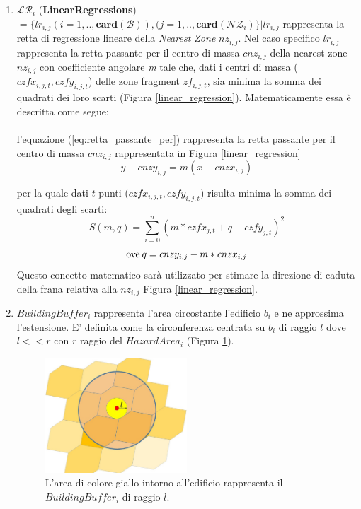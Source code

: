 \begin{enumerate}
	\item \textbf{$ \mathcal{LR}_i $} (\textbf{LinearRegressions}) $ = \{lr_{i,j}(i=1,..,\mathbf{card}(\mathcal{B})),(j=1,..,\mathbf{card}(\mathcal{NZ}_i)\} | lr_{i,j} $ rappresenta la retta di regressione lineare della \textit{Nearest Zone} $nz_{i,j}$. Nel caso specifico $lr_{i,j} $ rappresenta la retta passante per il centro di massa $cnz_{i,j}$ della nearest zone $nz_{i,j}$ con coefficiente angolare \textit{m} tale che, dati i centri di massa ($czfx_{i,j,t}, czfy_{i,j,t}$)  delle zone fragment $zf_{i,j,t}$,  sia minima la somma dei quadrati dei loro scarti (Figura \ref{linear_regression}). Matematicamente essa è descritta come segue:\\
	\\
	l'equazione (\ref{eq:retta_passante_per}) rappresenta la retta passante per il centro di massa $cnz_{i,j}$ rappresentata in Figura \ref{linear_regression}
	\begin{equation}\label{eq:retta_passante_per}
		y - cnzy_{i,j} = m(x-cnzx_{i,j})
	\end{equation}
	
	per la quale dati $t$ punti ($czfx_{i,j,t}, czfy_{i,j,t}$) risulta minima la somma dei quadrati degli scarti:
	\begin{equation}\label{eq:somma_degli_scarti}
		S(m, q) = \sum_{i=0}^n (m*czfx_{j,t} + q - czfy_{j,t})^2 
	\end{equation}
	\begin{equation}
		\textnormal{ove}\: q = cnzy_{i,j} - m*cnzx_{i,j}
	\end{equation}
	Questo concetto matematico sarà utilizzato per stimare la direzione di caduta della frana relativa alla $nz_{i,j}$ Figura \ref{linear_regression}.
		
	\newpage
	\item \textit{$BuildingBuffer_i$} rappresenta l'area circostante l'edificio $b_i$ e ne approssima l'estensione. E' definita come la circonferenza centrata su $b_i$ di raggio $l$ dove $l<<r $ con $r$ raggio del \textit{$HazardArea_i$} (Figura \ref{buildingimpactfactor}).
	
	\begin{figure}[h]
		\centering
		\includegraphics[width=0.5\textwidth]{images/buildingimpactfactor}
		\caption{L'area di colore giallo intorno all'edificio rappresenta il $BuildingBuffer_i$ di raggio $l$.}
		\label{buildingimpactfactor}
	\end{figure}
	

\end{enumerate}
